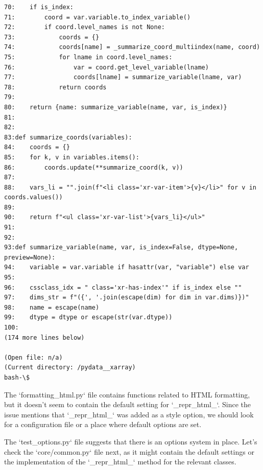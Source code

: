 {\begin{observationbox}
\begin{Verbatim}[breaklines=true, breakanywhere=true]
70:    if is_index:
71:        coord = var.variable.to_index_variable()
72:        if coord.level_names is not None:
73:            coords = {}
74:            coords[name] = _summarize_coord_multiindex(name, coord)
75:            for lname in coord.level_names:
76:                var = coord.get_level_variable(lname)
77:                coords[lname] = summarize_variable(lname, var)
78:            return coords
79:
80:    return {name: summarize_variable(name, var, is_index)}
81:
82:
83:def summarize_coords(variables):
84:    coords = {}
85:    for k, v in variables.items():
86:        coords.update(**summarize_coord(k, v))
87:
88:    vars_li = "".join(f"<li class='xr-var-item'>{v}</li>" for v in coords.values())
89:
90:    return f"<ul class='xr-var-list'>{vars_li}</ul>"
91:
92:
93:def summarize_variable(name, var, is_index=False, dtype=None, preview=None):
94:    variable = var.variable if hasattr(var, "variable") else var
95:
96:    cssclass_idx = " class='xr-has-index'" if is_index else ""
97:    dims_str = f"({', '.join(escape(dim) for dim in var.dims)})"
98:    name = escape(name)
99:    dtype = dtype or escape(str(var.dtype))
100:
(174 more lines below)

(Open file: n/a)
(Current directory: /pydata__xarray)
bash-\$
\end{Verbatim}
\end{observationbox}
\begin{agentbox}
The `formatting\_html.py` file contains functions related to HTML formatting, but it doesn't seem to contain the default setting for `\_repr\_html\_`. Since the issue mentions that `\_repr\_html\_` was added as a style option, we should look for a configuration file or a place where default options are set.



The `test\_options.py` file suggests that there is an options system in place. Let's check the `core/common.py` file next, as it might contain the default settings or the implementation of the `\_repr\_html\_` method for the relevant classes.




\end{agentbox}}
